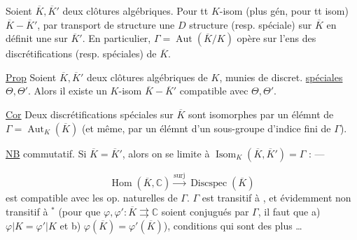 Soient $\overline K,\overline K'$ deux clôtures algébriques.
Pour tt  $K$-isom (plus gén, pour tt isom)
$\overline K\mathbin{-}\overline K'$, par transport de structure une $D$ structure
(resp. spéciale) sur $\overline K$ en définit une sur $\overline K'$.
En particulier, $\Gamma=\operatorname{Aut}(\overline K/K)$ opère sur l'ens des
discrétifications (resp. spéciales) de $\overline K$.

\uline{Prop} Soient $\overline K,\overline K'$ deux clôtures algébriques de $K$,
munies de discret. \uline{spéciales} $\Theta,\Theta'$. Alors il existe un
$K$-isom $\overline K\mathbin{-}\overline K'$ compatible avec $\Theta,\Theta'$.

\uline{Cor} Deux discrétifications spéciales sur $\overline K$ sont isomorphes
par un élémnt de $\Gamma=\operatorname{Aut}_K(\overline K)$ (et même, par un élémnt
d'un sous-groupe d'indice fini  de $\Gamma$).

\uline{NB}
  commutatif.
Si $\overline K=\overline K'$, alors on se limite à
$\operatorname{Isom}_K(\overline K,\overline K')=\Gamma$ : --- 

\[
\operatorname{Hom}(\overline K,\mathbb C)\xrightarrow{\mathrm{surj}}
\operatorname{Discspec}(\overline K)
\]
est  compatible avec les op. naturelles de $\Gamma$.
 $\Gamma$ est transitif à
, et évidemment non transitif à
$^*$ (pour que
$\varphi,\varphi':\overline K\rightrightarrows\mathbb C$ soient conjugués par $\Gamma$,
il faut que a) $\varphi|K=\varphi'|K$ et b)
$\varphi(\overline K)=\varphi'(\overline K)$), conditions qui sont des plus
\ldots
{}

